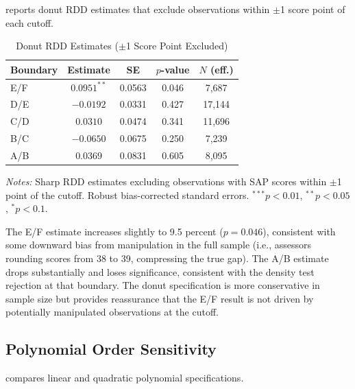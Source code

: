 \documentclass[12pt]{article}
\begin{document}
 reports donut RDD estimates that exclude observations within $\pm$1 score point of each cutoff.

\begin{table}[H]
\centering
\caption{Donut RDD Estimates ($\pm$1 Score Point Excluded)}
\label{tab:donut}
\begin{tabular}{lcccc}
\toprule
Boundary & Estimate & SE & $p$-value & $N$ (eff.) \\
\midrule
E/F & $0.0951^{**}$ & 0.0563 & 0.046 & 7,687 \\
D/E & $-0.0192$ & 0.0331 & 0.427 & 17,144 \\
C/D & $0.0310$ & 0.0474 & 0.341 & 11,696 \\
B/C & $-0.0650$ & 0.0675 & 0.250 & 7,239 \\
A/B & $0.0369$ & 0.0831 & 0.605 & 8,095 \\
\bottomrule
\end{tabular}
\begin{minipage}{\textwidth}
\footnotesize
\textit{Notes:} Sharp RDD estimates excluding observations with SAP scores within $\pm$1 point of the cutoff. Robust bias-corrected standard errors. $^{***}p<0.01$, $^{**}p<0.05$, $^{*}p<0.1$.
\end{minipage}
\end{table}

The E/F estimate increases slightly to 9.5 percent ($p = 0.046$), consistent with some downward bias from manipulation in the full sample (i.e., assessors rounding scores from 38 to 39, compressing the true gap). The A/B estimate drops substantially and loses significance, consistent with the density test rejection at that boundary. The donut specification is more conservative in sample size but provides reassurance that the E/F result is not driven by potentially manipulated observations at the cutoff.

\subsection{Polynomial Order Sensitivity}

 compares linear and quadratic polynomial specifications.
\end{document}

